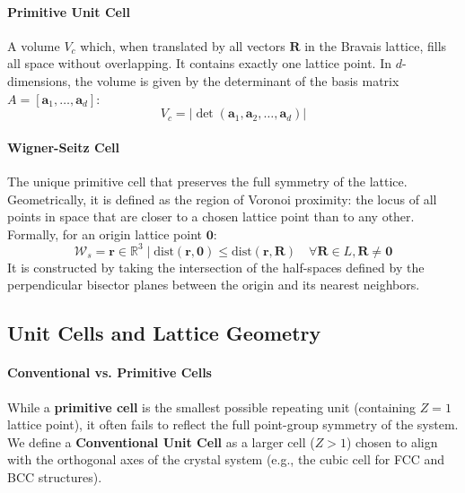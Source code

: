 \documentclass[10pt, a4paper]{article}
\begin{document}
\paragraph{Primitive Unit Cell}
A volume $V_c$ which, when translated by all vectors $\mathbf{R}$ in the Bravais lattice, fills all space without overlapping. It contains exactly one lattice point. In $d$-dimensions, the volume is given by the determinant of the basis matrix $A = [\mathbf{a}_1, \dots, \mathbf{a}_d]$:
\begin{equation}
    V_c = |\det(\mathbf{a}_1, \mathbf{a}_2, \dots, \mathbf{a}_d)|
\end{equation}

\paragraph{Wigner-Seitz Cell}
The unique primitive cell that preserves the full symmetry of the lattice. Geometrically, it is defined as the region of Voronoi proximity: the locus of all points in space that are closer to a chosen lattice point than to any other. Formally, for an origin lattice point $\mathbf{0}$:
\begin{equation}
    \mathcal{W}_s = { \mathbf{r} \in \mathbb{R}^3 \mid \text{dist}(\mathbf{r}, \mathbf{0}) \leq \text{dist}(\mathbf{r}, \mathbf{R}) \quad \forall \mathbf{R} \in L, \mathbf{R} \neq \mathbf{0} }
\end{equation}
It is constructed by taking the intersection of the half-spaces defined by the perpendicular bisector planes between the origin and its nearest neighbors.



\subsection{Unit Cells and Lattice Geometry}

\paragraph{Conventional vs. Primitive Cells}
While a \textbf{primitive cell} is the smallest possible repeating unit (containing $Z=1$ lattice point), it often fails to reflect the full point-group symmetry of the system. We define a \textbf{Conventional Unit Cell} as a larger cell ($Z > 1$) chosen to align with the orthogonal axes of the crystal system (e.g., the cubic cell for FCC and BCC structures).
\end{document}
